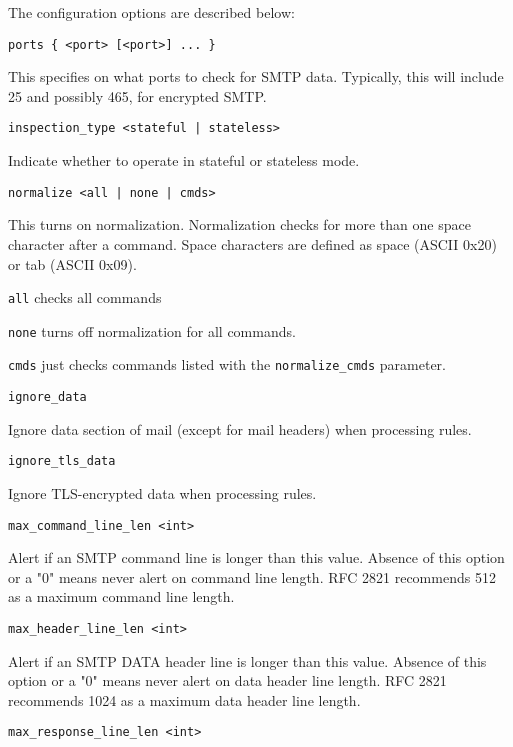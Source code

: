 \documentclass[english]{report}
\newcounter{slistnum}
\newenvironment{slist}
{ \begin{list}{ {\bf \arabic{slistnum}.} }{\usecounter{slistnum} } }
{ \end{list} }
\begin{document}
The configuration options are described below:

\begin{slist}

\item \texttt{ports \{ <port> [<port>] ... \}}

This specifies on what ports to check for SMTP data.  Typically, this will
include 25 and possibly 465, for encrypted SMTP.

\item \texttt{inspection\_type <stateful | stateless>}

Indicate whether to operate in stateful or stateless mode.

\item \texttt{normalize <all | none | cmds>}

This turns on normalization.  Normalization checks for more than one space
character after a command.  Space characters are defined as space (ASCII 0x20)
or tab (ASCII 0x09).

\texttt{all} checks all commands

\texttt{none} turns off normalization for all commands.

\texttt{cmds} just checks commands listed with the \texttt{normalize\_cmds} parameter.

\item \texttt{ignore\_data}

Ignore data section of mail (except for mail headers) when processing rules.

\item \texttt{ignore\_tls\_data}

Ignore TLS-encrypted data when processing rules.

\item \texttt{max\_command\_line\_len <int>}

Alert if an SMTP command line is longer than this value.  Absence of this
option or a "0" means never alert on command line length.  RFC 2821 recommends
512 as a maximum command line length.

\item \texttt{max\_header\_line\_len <int>}

Alert if an SMTP DATA header line is longer than this value.  Absence of this
option or a "0" means never alert on data header line length.  RFC 2821
recommends 1024 as a maximum data header line length.

\item \texttt{max\_response\_line\_len <int>}


\end{slist}
\end{document}

